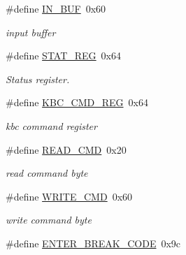 \begin{DoxyCompactItemize}
\#define \hyperlink{group__keyboard__macros_ga783be5698cf07b1daaf126ef89c19063}{I\+N\+\_\+\+B\+UF}~0x60
\begin{DoxyCompactList}\small\item\em input buffer \end{DoxyCompactList}\item 
\mbox{\label{group__keyboard__macros_ga89c4d098b53809674457b1660b1af780}} 
\#define \hyperlink{group__keyboard__macros_ga89c4d098b53809674457b1660b1af780}{S\+T\+A\+T\+\_\+\+R\+EG}~0x64
\begin{DoxyCompactList}\small\item\em Status register. \end{DoxyCompactList}\item 
\mbox{\label{group__keyboard__macros_ga6d57c7927a10f638c83046b52c8caac9}} 
\#define \hyperlink{group__keyboard__macros_ga6d57c7927a10f638c83046b52c8caac9}{K\+B\+C\+\_\+\+C\+M\+D\+\_\+\+R\+EG}~0x64
\begin{DoxyCompactList}\small\item\em kbc command register \end{DoxyCompactList}\item 
\mbox{\label{group__keyboard__macros_ga21623e2a5501c821da54dd76ffc1d077}} 
\#define \hyperlink{group__keyboard__macros_ga21623e2a5501c821da54dd76ffc1d077}{R\+E\+A\+D\+\_\+\+C\+MD}~0x20
\begin{DoxyCompactList}\small\item\em read command byte \end{DoxyCompactList}\item 
\mbox{\label{group__keyboard__macros_gaf792feb13ae0c1eab8f95f64c8baa96d}} 
\#define \hyperlink{group__keyboard__macros_gaf792feb13ae0c1eab8f95f64c8baa96d}{W\+R\+I\+T\+E\+\_\+\+C\+MD}~0x60
\begin{DoxyCompactList}\small\item\em write command byte \end{DoxyCompactList}\item 
\mbox{\label{group__keyboard__macros_ga54db80d887c9139084b1a66243fa3f72}} 
\#define \hyperlink{group__keyboard__macros_ga54db80d887c9139084b1a66243fa3f72}{E\+N\+T\+E\+R\+\_\+\+B\+R\+E\+A\+K\+\_\+\+C\+O\+DE}~0x9c

\end{DoxyCompactItemize}
